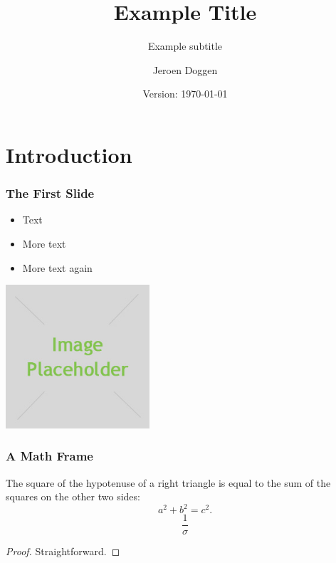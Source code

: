 \documentclass{beamer}
\title[]{Example Title}
\subtitle{Example subtitle}
\author{Jeroen Doggen}
\institute{AP University College Antwerpen}
\date{Version: \today}
\begin{document}
\maketitle

\section{Introduction}

\begin{frame} 
\frametitle{The First Slide}
\begin{itemize}
 \item Text
 \item More text
 \item More text again
\end{itemize}
\begin{center}
  \includegraphics[width=0.4\textwidth]{images/placeholder.jpg}
\end{center}
\end{frame}


\begin{frame}
\frametitle{A Math Frame}
  \begin{theorem}[Pythagoras]
    The square of the hypotenuse of a \alert{right} triangle is equal to the sum of the squares on the other two sides:
    \[
    a^2 + b^2 = c^2.
    \]
    \[\frac{1}{\sigma}\]
  \end{theorem}
  \begin{proof}
    Straightforward.
  \end{proof}
\end{frame}
\end{document}

